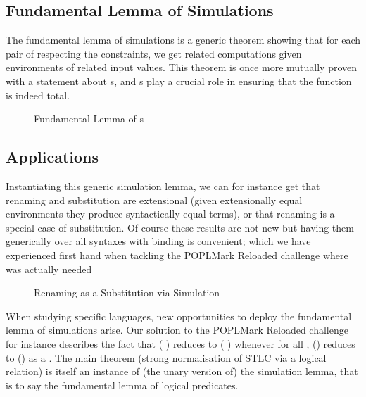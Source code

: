 
\subsection{Fundamental Lemma of Simulations}

The fundamental lemma of simulations is a generic theorem showing that for
each pair of  respecting the  constraints, we
get related computations given environments of related input values. This
theorem is once more mutually proven with a statement about s,
and s play a crucial role in ensuring that the function is indeed total.

\begin{figure}[h]
\caption{Fundamental Lemma of s}
\end{figure}

\subsection{Applications}

Instantiating this generic simulation lemma, we can for instance get
that renaming and substitution are extensional (given extensionally
equal environments they produce syntactically equal terms), or that
renaming is a special case of substitution. Of course these results
are not new but having them generically over all syntaxes with binding
is convenient; which we have experienced first hand when tackling the
POPLMark Reloaded challenge where  was actually needed

\begin{figure}[h]
\caption{Renaming as a Substitution via Simulation}
\end{figure}

When studying specific languages, new opportunities to deploy the
fundamental lemma of simulations arise. Our solution to the POPLMark
Reloaded challenge for instance describes the fact that ({  })
reduces to ({  }) whenever for all ,
() reduces to () as a .
The main theorem (strong normalisation of STLC via a logical relation)
is itself an instance of (the unary version of) the simulation lemma,
that is to say the fundamental lemma of logical predicates.

